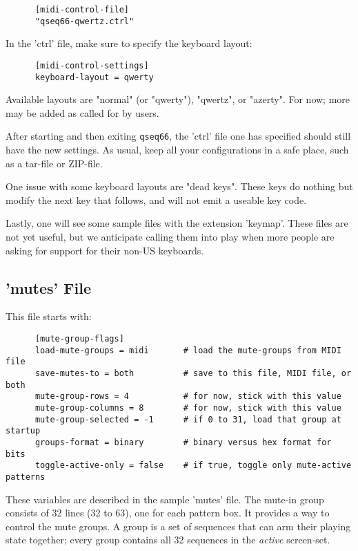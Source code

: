    \begin{verbatim}
      [midi-control-file]
      "qseq66-qwertz.ctrl"
   \end{verbatim}

   In the 'ctrl' file, make sure to specify the keyboard layout:

   \begin{verbatim}
      [midi-control-settings]
      keyboard-layout = qwerty
   \end{verbatim}

   Available layouts are "normal" (or "qwerty"),
   "qwertz", or "azerty".  For now; more may be added as called for by users.

   After starting and then exiting \texttt{qseq66},
   the 'ctrl' file one has specified
   should still have the new settings.
   As usual, keep all your configurations in a safe place, such as a tar-file or
   ZIP-file.

   One issue with some keyboard layouts are "dead keys".  These keys do
   nothing but modify the next key that follows, and will not emit
   a useable key code.

   Lastly, one will see some sample files with the extension 'keymap'.
   These files are not yet useful, but we anticipate calling them into play
   when more people are asking for support for their non-US keyboards.

\subsection{'mutes' File}
\label{subsubsec:configuration_mute_group_control}

   This file starts with:

   \begin{verbatim}
      [mute-group-flags]
      load-mute-groups = midi       # load the mute-groups from MIDI file
      save-mutes-to = both          # save to this file, MIDI file, or both
      mute-group-rows = 4           # for now, stick with this value
      mute-group-columns = 8        # for now, stick with this value
      mute-group-selected = -1      # if 0 to 31, load that group at startup
      groups-format = binary        # binary versus hex format for bits
      toggle-active-only = false    # if true, toggle only mute-active patterns
   \end{verbatim}

   These variables are described in the sample 'mutes' file.
   The mute-in group consists of 32 lines (32 to 63), one for each
   pattern box.
   It provides a way to control the mute groups.
   A group is a set of sequences that can arm their playing state
   together; every group contains all 32 sequences in the
   \textsl{active} screen-set.

